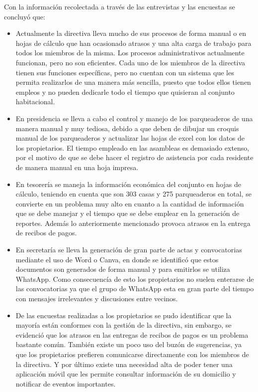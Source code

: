 Con la información recolectada a través de las entrevistas y las encuestas se concluyó que:
\begin{itemize}
    \item Actualmente la directiva lleva mucho de sus procesos de forma manual o en hojas de cálculo que han ocasionado atrasos y una alta carga de trabajo para todos los miembros de la misma.
    Los procesos administrativos actualmente funcionan, pero no son eficientes.
    Cada uno de los miembros de la directiva tienen sus funciones específicas, pero no cuentan con un sistema que les permita realizarlos de una manera más sencilla, puesto que todos ellos tienen empleos y no pueden dedicarle todo el tiempo que quisieran al conjunto habitacional.
    \item En presidencia se lleva a cabo el control y manejo de los parqueaderos de una manera manual y muy tediosa, debido a que deben de dibujar un croquis manual de los parqueaderos y actualizar las hojas de excel con los datos de los propietarios. El tiempo empleado en las asambleas es demasiado extenso, por el motivo de que se debe hacer el registro de asistencia por cada residente de manera manual en una hoja impresa.
    \item En tesorería se maneja la información económica del conjunto en hojas de cálculo, teniendo en cuenta que son 303 casas y 275 parqueaderos en total, se convierte en un problema muy alto en cuanto a la cantidad de información que se debe manejar y el tiempo que se debe emplear en la generación de reportes. Además lo anteriormente mencionado provoca atrasos en la entrega de recibos de pagos.
    \item En secretaría se lleva la generación de gran parte de actas y convocatorias mediante el uso de Word o Canva, en donde se identificó que estos documentos son generados de forma manual y para emitirlos se utiliza WhatsApp. Como consecuencía de esto los propietarios no suelen enterarse de las convocatorias ya que el grupo de  WhatsApp esta en gran parte del tiempo con mensajes irrelevantes y discusiones entre vecinos.
    \item De las encuestas realizadas a los propietarios se pudo identificar que la mayoría están conformes con la gestión de la directiva, sin embargo, se
     evidenció que los atrasos en las entregas de recibos de pagos es un problema bastante común. También existe un poco uso del buzón de sugerencias, ya que los propietarios prefieren comunicarse directamente con los miembros de la directiva. Y por último existe una necesidad alta de poder tener una aplicación móvil que les permite consultar información de su domicilio y notificar de eventos importantes.
\end{itemize}